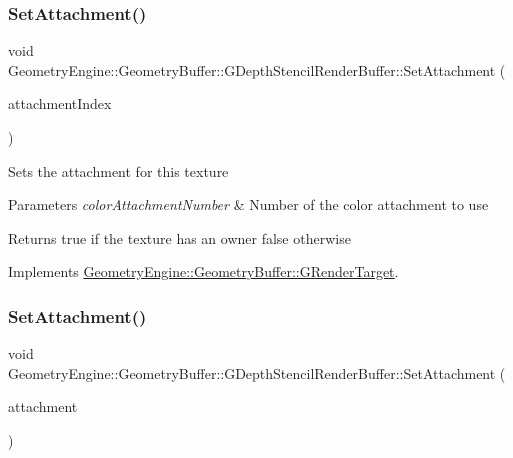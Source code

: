 \subsubsection{\texorpdfstring{SetAttachment()}{SetAttachment()}\hspace{0.1cm}{\footnotesize\ttfamily [1/2]}}
{\footnotesize\ttfamily void Geometry\+Engine\+::\+Geometry\+Buffer\+::\+G\+Depth\+Stencil\+Render\+Buffer\+::\+Set\+Attachment (\begin{DoxyParamCaption}\item[{unsigned int}]{attachment\+Index }\end{DoxyParamCaption})\hspace{0.3cm}{\ttfamily [virtual]}}

Sets the attachment for this texture 
\begin{DoxyParams}{Parameters}
{\em color\+Attachment\+Number} & Number of the color attachment to use \\
\hline
\end{DoxyParams}
\begin{DoxyReturn}{Returns}
true if the texture has an owner false otherwise 
\end{DoxyReturn}


Implements \mbox{\hyperlink{class_geometry_engine_1_1_geometry_buffer_1_1_g_render_target_a1031c44ad374654e2183d3b1b99638a3}{Geometry\+Engine\+::\+Geometry\+Buffer\+::\+G\+Render\+Target}}.

\mbox{\label{class_geometry_engine_1_1_geometry_buffer_1_1_g_depth_stencil_render_buffer_aa207dc312758fcd7657836e6783c14e4}} 
\subsubsection{\texorpdfstring{SetAttachment()}{SetAttachment()}\hspace{0.1cm}{\footnotesize\ttfamily [2/2]}}
{\footnotesize\ttfamily void Geometry\+Engine\+::\+Geometry\+Buffer\+::\+G\+Depth\+Stencil\+Render\+Buffer\+::\+Set\+Attachment (\begin{DoxyParamCaption}\item[{G\+Framebuffer\+Commons\+::\+G\+\_\+\+D\+E\+P\+T\+H\+\_\+\+S\+T\+E\+N\+C\+I\+L\+\_\+\+A\+T\+T\+A\+C\+H\+M\+E\+N\+TS}]{attachment }\end{DoxyParamCaption})}

